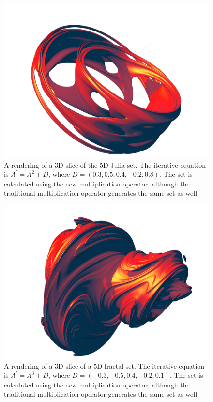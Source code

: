 \documentclass[12pt]{article}
\begin{document}
\begin{figure} 
\centering
  \includegraphics[width = 6 in]{quint_z2_c.png}
  \caption{A rendering of a $3$D slice of the $5$D Julia set.
The iterative equation is $A^{\prime} = A^2 + D$, where $D = (0.3, 0.5, 0.4, -0.2, 0.8)$.
The set is calculated using the new multiplication operator, although the traditional multiplication operator generates the same set as well.
}
\end{figure}

\begin{figure} 
\centering
  \includegraphics[width = 6 in]{quint_z3_c.png}
  \caption{A rendering of a $3$D slice of a $5$D fractal set.
The iterative equation is $A^{\prime} = A^3 + D$, where $D = (-0.3, -0.5, 0.4, -0.2, 0.1)$.
The set is calculated using the new multiplication operator, although the traditional multiplication operator generates the same set as well.
}
\end{figure}
\end{document}
